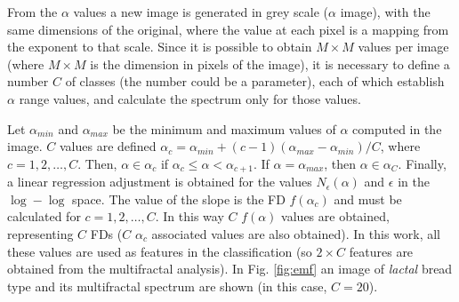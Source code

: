 \documentclass[oneside,a4paper,english,links]{amca}
\begin{document}
From the $\alpha$ values a new image is generated in grey scale ($\alpha$ image), with the same dimensions of the original, where the value at each pixel is a mapping from the exponent to that scale. Since it is possible to obtain $M\times M$ values per image (where $M\times M$ is the dimension in pixels of the image), it is necessary to define a number $C$ of classes (the number could be a parameter), each of which establish $\alpha$ range values, and calculate the spectrum only for those values.

Let $\alpha_{min}$ and  $\alpha_{max}$ be the minimum and maximum values of $\alpha$ computed in the image. $C$ values are defined $\alpha_{c} = \alpha_{min} + (c-1)(\alpha_{max}-\alpha_{min})/C$, where $c = 1,2,\dots,C$. Then, $\alpha \in \alpha_{c}$ if $\alpha_{c} \leq \alpha < \alpha_{c+1}$. If $\alpha = \alpha_{max}$, then $\alpha \in \alpha_{C}$. Finally, a linear regression adjustment is obtained for the values $N_{\epsilon}(\alpha)$ and $\epsilon$ in the $\log-\log$ space. The value of the slope is the FD $f(\alpha_{c})$ and must be calculated for $c = 1,2,\dots,C$. In this way $C$ $f(\alpha)$ values are obtained, representing $C$ FDs ($C$ $\alpha_{c}$ associated values are also obtained). In this work, all these values are used as features in the classification (so $2\times C$ features are obtained from the multifractal analysis). In Fig. \ref{fig:emf} an image of {\em lactal} bread type and its multifractal spectrum are shown (in this case, $C = 20$).
\end{document}
